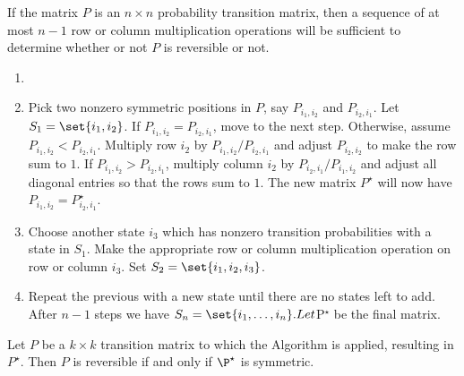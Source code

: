 \documentclass[12pt]{article}
\begin{document}
If the matrix $P$ is an $n \times n$ probability transition matrix, then a sequence of at
most $n −1$ row or column multiplication operations will be sufficient to determine
whether or not $P$ is reversible or not.
\begin{enumerate}
\item 
\item Pick two nonzero symmetric positions in $P$, say $P_{i_1,i_2}$ and $P_{i_2,i_1}$. Let $S_1 =
\set{i_1, i_2}$. If $P_{i_1,i_2} = P_{i_2,i_1}$, move to the next step. Otherwise, assume $P_{i_1,i_2 }< P_{i_2,i_1}$.
Multiply row $i_2$ by $P_{i_1,i_2}/P_{i_2,i_1}$ and adjust $P_{i_2,i_2}$ to make the row sum to $1$. If
$P_{i_1,i_2} > P_{i_2,i_1}$, multiply column $i_2$ by $P_{i_2,i_1}/P_{i_1,i_2}$ and adjust all diagonal entries so
that the rows sum to $1$. The new matrix $P^{\star}$ will now have $P_{i_1,i_2} = P_{i_2,i_1}^{\star}$.
\item Choose another state $i_3$ which has nonzero transition probabilities with a state
in $S_1$. Make the appropriate row or column multiplication operation on row or
column $i_3$. Set $S_2 = \set{i_1, i_2, i_3}$.
\item  Repeat the previous with a new state until there are no states left to add. After $n −1$
steps we have $S_n = \set{i_1, \dots, i_n}. Let $P$^{\star}$ be the
final matrix.
\end{enumerate}

\begin{theorem}
  Let $P$ be a $k \times k$ transition matrix to which the Algorithm
  is applied, resulting in $P^{\star}$.  Then $P$ is reversible if and
  only if $\P^{\star}$ is symmetric.
\end{theorem}
\end{document}
